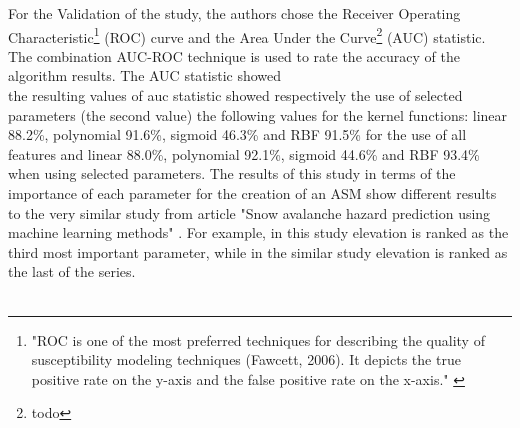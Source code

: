 \documentclass[../masterarbeit.tex]{subfiles}
\begin{document}
For the Validation of the study, the authors chose the Receiver Operating Characteristic\footnote{"ROC is one of the most preferred techniques for describing the quality of susceptibility modeling techniques (Fawcett, 2006). It depicts the true positive rate on the y-axis and the false positive rate on the x-axis." \autocite[]{Tiwari:2021}} (ROC) curve and the Area Under the Curve\footnote{todo} (AUC) statistic. The combination AUC-ROC technique is used to rate the accuracy of the algorithm results. The AUC statistic showed \autocite[]{Tiwari:2021} \\
the resulting values of auc statistic showed respectively the use of selected parameters (the second value) the following values for the kernel functions: linear 88.2\%, polynomial 91.6\%, sigmoid 46.3\% and RBF 91.5\% for the use of all features and linear 88.0\%, polynomial 92.1\%, sigmoid 44.6\% and RBF 93.4\% when using selected parameters.
The results of this study in terms of the importance of each parameter for the creation of an ASM show different results to the very similar study from article "Snow avalanche hazard prediction using machine learning methods" \textcite[]{Bahram:2019}. For example, in this study elevation is ranked as the third most important parameter, while in the similar study elevation is ranked as the last of the series.  \autocite[]{Tiwari:2021} \autocite[]{Bahram:2019} \\~\\
\end{document}
